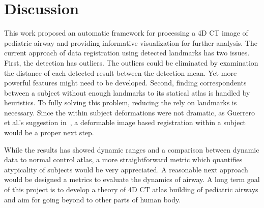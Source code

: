 \section{Discussion}
\label{sec:discussion}
This work proposed an automatic framework for processing a 4D CT image of pediatric airway and providing informative visualization for further analysis.
The current approach of data registration using detected landmarks has two issues.
First, the detection has outliers.
The outliers could be eliminated by examination the distance of each detected result between the detection mean.
Yet more powerful features might need to be developed.
Second, finding correspondents between a subject without enough landmarks to its statical atlas is handled by heuristics.
To fully solving this problem, reducing the rely on landmarks is necessary.
Since the within subject deformations were not dramatic, as Guerrero et al.'s suggestion in~\cite{guerrero2006dynamic}, a deformable image based registration within a subject would be a proper next step.

While the results has showed dynamic ranges and a comparison between dynamic data to normal control atlas, a more straightforward metric which quantifies atypicality of subjects would be very appreciated.
A reasonable next approach would be designed a metrics to evaluate the dynamics of airway.
A long term goal of this project is to develop a theory of 4D CT atlas building of pediatric airways and aim for going beyond to other parts of human body.